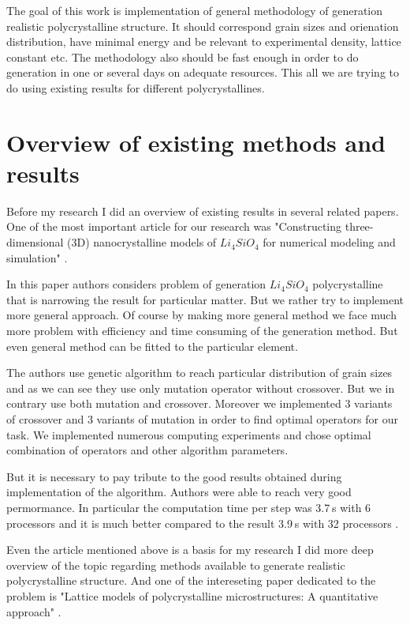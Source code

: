 \documentclass{article}
\begin{document}
The goal of this work is implementation of general methodology of generation realistic polycrystalline structure. It should correspond grain sizes and orienation distribution, have minimal energy and be relevant to experimental density, lattice constant etc. The methodology also should be fast enough in order to do generation in one or several days on adequate resources. This all we are trying to do using existing results for different polycrystallines.


\section{Overview of existing methods and results}

Before my research I did an overview of existing results in several related papers. One of the most important article for our research was "Constructing three-dimensional (3D) nanocrystalline models of $ Li_4SiO_4 $ for numerical modeling and simulation" \cite{shen15}.

In this paper authors considers problem of generation $ Li_4SiO_4 $ polycrystalline that is  narrowing the result for particular matter. But we rather try to implement more general approach. Of course by making more general method we face much more problem with efficiency and time consuming of the generation method. But even general method can be fitted to the particular element.

The authors use genetic algorithm to reach particular distribution of grain sizes and as we can see they use only mutation operator without crossover. But we in contrary use both mutation and crossover. Moreover we implemented 3 variants of crossover and 3 variants of mutation in order to find optimal operators for our task. We implemented numerous computing experiments and chose optimal combination of operators and other algorithm parameters.

But it is necessary to pay tribute to the good results obtained during implementation of the algorithm. Authors were able to reach very good permormance. In particular the computation time per step was 3.7 s with 6 processors and it is much better compared to the result 3.9 s with 32 processors \cite{suzudo02}.

Even the article mentioned above is a basis for my research I did more deep overview of the topic regarding methods available to generate realistic polycrystalline structure. And one of the intereseting paper dedicated to the problem is "Lattice models of polycrystalline microstructures: A quantitative approach" \cite{rinaldi08}.
\end{document}

